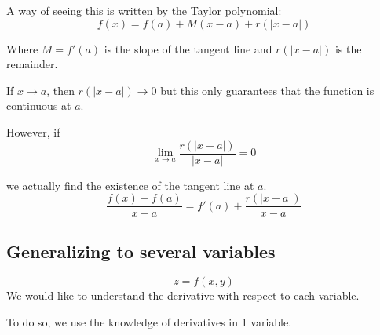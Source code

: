 \documentclass[11pt]{article}
\begin{document}
\begin{center}
\end{center}

A way of seeing this is written by the Taylor polynomial:
\[
f(x) = f(a) + M(x - a) + r(|x - a|)
\]

Where $M = f'(a)$ is the slope of the tangent line and $r(|x - a|)$ is the remainder.

If $x \to a$, then $r(|x - a|) \to 0$ but this only guarantees that the function is continuous at $a$.

However, if
\[
\lim_{x \to a} \frac{r(|x - a|)}{|x - a|} = 0
\]

we actually find the existence of the tangent line at $a$.
\[
\frac{f(x) - f(a)}{x - a} = f'(a) + \frac{r(|x - a|)}{x - a}
\]

\subsection{Generalizing to several variables}
\[
z = f(x,y)
\]
We would like to understand the derivative with respect to each variable.

To do so, we use the knowledge of derivatives in 1 variable.
\end{document}
